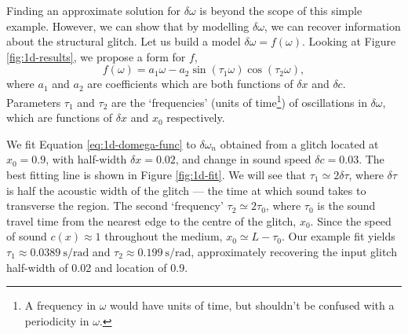 Finding an approximate solution for \(\delta\omega\) is beyond the scope of this simple example. However, we can show that by modelling \(\delta\omega\), we can recover information about the structural glitch. Let us build a model \(\delta\omega = f(\omega)\). Looking at Figure \ref{fig:1d-results}, we propose a form for \(f\),
%
\begin{equation}
    f(\omega) = a_1 \omega - a_2 \sin (\tau_1 \omega) \cos (\tau_2 \omega), \label{eq:1d-domega-func}
\end{equation}
%
where \(a_1\) and \(a_2\) are coefficients which are both functions of \(\delta x\) and \(\delta c\). Parameters \(\tau_1\) and \(\tau_2\) are the `frequencies' (units of time\footnote{A frequency in \(\omega\) would have units of time, but shouldn't be confused with a periodicity in \(\omega\).}) of oscillations in \(\delta\omega\), which are functions of \(\delta x\) and \(x_0\) respectively.

We fit Equation \ref{eq:1d-domega-func} to \(\delta\omega_n\) obtained from a glitch located at \(x_0 = 0.9\), with half-width \(\delta x = 0.02\), and change in sound speed \(\delta c = 0.03\). The best fitting line is shown in Figure \ref{fig:1d-fit}. We will see that \(\tau_1 \simeq 2\delta\tau\), where \(\delta\tau\) is half the acoustic width of the glitch --- the time at which sound takes to transverse the region. The second `frequency' \(\tau_2 \simeq 2\tau_0\), where \(\tau_0\) is the sound travel time from the nearest edge to the centre of the glitch, \(x_0\). Since the speed of sound \(c(x) \approx 1\) throughout the medium, \(x_0 \simeq L - \tau_0\). Our example fit yields \(\tau_1 \approx \SI{0.0389}{\second\per\radian}\) and \(\tau_2 \approx \SI{0.199}{\second\per\radian}\), approximately recovering the input glitch half-width of \num{0.02} and location of \num{0.9}.




